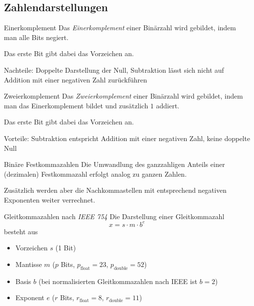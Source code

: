 \documentclass[german]{spicker}
\begin{document}
\newpage
\subsection{Zahlendarstellungen}

\begin{defi}{Einerkomplement}
    Das \emph{Einerkomplement} einer Binärzahl wird gebildet, indem man alle Bits negiert.

    Das erste Bit gibt dabei das Vorzeichen an.

    Nachteile: Doppelte Darstellung der Null, Subtraktion lässt sich nicht auf Addition mit einer negativen Zahl zurückführen
\end{defi}

\begin{defi}{Zweierkomplement}
    Das \emph{Zweierkomplement} einer Binärzahl wird gebildet, indem man das Einerkomplement bildet und zusätzlich $1$ addiert.

    Das erste Bit gibt dabei das Vorzeichen an.

    Vorteile: Subtraktion entspricht Addition mit einer negativen Zahl, keine doppelte Null
\end{defi}

\begin{defi}{Binäre Festkommazahlen}
    Die Umwandlung des ganzzahligen Anteils einer (dezimalen) Festkommazahl erfolgt analog zu ganzen Zahlen.

    Zusätzlich werden aber die Nachkommastellen mit entsprechend negativen Exponenten weiter \glqq verrechnet\grqq.
\end{defi}

\begin{defi}{Gleitkommazahlen nach \emph{IEEE 754}}
    Die Darstellung einer Gleitkommazahl
    $$
        x = s \cdot m \cdot b^e
    $$
    besteht aus
    \begin{itemize}
        \item Vorzeichen $s$ (1 Bit)
        \item Mantisse $m$ ($p$ Bits, $p_{\text{float}} = 23$, $p_{\text{double}} = 52$)
        \item Basis $b$ (bei normalisierten Gleitkommazahlen nach IEEE ist $b = 2$)
        \item Exponent $e$ ($r$ Bits, $r_{\text{float}} = 8$, $r_{\text{double}} = 11$)
    \end{itemize}
\end{defi}
\end{document}
